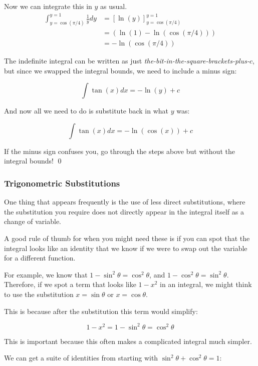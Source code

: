 \begin{solution}
    Now we can integrate this in $y$ as usual.
    \begin{align*}
         \int_{y=\cos(\pi/4)}^{y=1} \frac{1}{y} dy &= \left[ \ln(y) \right]_{y=\cos(\pi/4)}^{y=1} \\
         &=  \left( \ln(1) - \ln(\cos(\pi/4)) \right) \\
         &=  -\ln(\cos(\pi/4)) 
    \end{align*}

    The indefinite integral can be written as just \emph{the-bit-in-the-square-brackets-plus-$c$}, but since we swapped the integral bounds, we need to include a minus sign:

    \[ \int \tan(x) dx  = -\ln(y) + c \]

    And now all we need to do is substitute back in what $y$ was:

    \[ \int \tan(x) dx  = -\ln(\cos(x)) + c \]

    If the minus sign confuses you, go through the steps above but without the integral bounds!
    \qed
\end{solution}

\subsubsection{Trigonometric Substitutions} \label{sec:trig-subs}

One thing that appears frequently is the use of less direct substitutions, where the substitution you require does not directly appear in the integral itself as a change of variable.

A good rule of thumb for when you might need these is if you can spot that the integral looks like an identity that we know if we were to swap out the variable for a different function.

For example, we know that $1-\sin^2\theta = \cos^2 \theta$, and $1-\cos^2\theta = \sin^2 \theta$. Therefore, if we spot a term that looks like $1-x^2$ in an integral, we might think to use the substitution $x = \sin \theta$ or $x = \cos \theta$.

This is because after the substitution this term would simplify:

\[1- x^2 = 1 - \sin^2 \theta = \cos^2 \theta \]

This is important because this often makes a complicated integral much simpler.

We can get a suite of identities from starting with $\sin^2 \theta + \cos^2 \theta = 1$:

